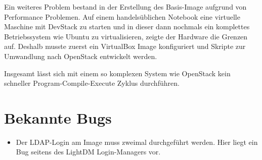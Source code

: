 Ein weiteres Problem bestand in der Erstellung des Basis-Image aufgrund von Performance Problemen.
Auf einem handelsüblichen Notebook eine virtuelle Maschine mit DevStack zu starten und in dieser dann nochmals ein komplettes Betriebssystem wie Ubuntu zu virtualisieren, zeigte der Hardware die Grenzen auf.
Deshalb musste zuerst ein VirtualBox Image konfiguriert und Skripte zur Umwandlung nach OpenStack entwickelt werden.

Insgesamt lässt sich mit einem so komplexen System wie OpenStack kein schneller Program-Compile-Execute Zyklus durchführen.

\section{Bekannte Bugs}

\begin{itemize}
\item Der LDAP-Login am Image muss zweimal durchgeführt werden. Hier liegt ein Bug seitens des LightDM Login-Managers vor.
\end{itemize}